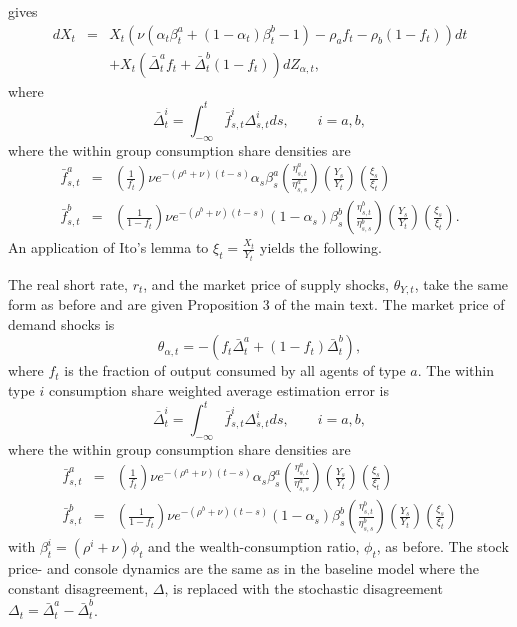 gives
\begin{eqnarray}
	dX_t &=& X_t\left( \nu\left(\alpha_t \beta^a_t + \left(1-\alpha_t\right)\beta^b_t - 1\right)  - \rho_a f_t - \rho_b \left(1-f_t\right)\right) dt  \nonumber \\
	&&+ X_t\left(\bar{\Delta}^{a}_t f_t + \bar{\Delta}^b_t \left(1-f_t\right)\right)dZ_{\alpha,t},
\end{eqnarray}
where 
\begin{equation}
	\bar{\Delta}^i_t = \int_{-\infty}^{t} \bar{f}^i_{s,t} \Delta^i_{s,t}ds,  \qquad i=a,b,
\end{equation}
where  the within group consumption share densities are
\begin{eqnarray}
	\bar{f}^a_{s,t} &=&\left(\frac{1}{f_t}\right)\nu e^{-\left(\rho^a+\nu\right)\left(t-s\right)} \alpha_s \beta^a_{s}\left(\frac{\eta^a_{s,t}}{\eta^a_{s,s}}\right)\left(\frac{Y_s}{Y_t}\right)\left(\frac{\xi_s}{\xi_t}\right)\\
	\bar{f}^b_{s,t} &=& \left(\frac{1}{1-f_t}\right)\nu e^{-\left(\rho^b+\nu\right)\left(t-s\right)} \left(1-\alpha_s\right) \beta^b_{s}\left(\frac{\eta^b_{s,t}}{\eta^b_{s,s}}\right)\left(\frac{Y_s}{Y_t}\right)\left(\frac{\xi_s}{\xi_t}\right).
\end{eqnarray}
An application of Ito's lemma to $\xi_t = \frac{X_t}{Y_t}$ yields the following. 

\begin{prop}\label{SDFgeneralDIS}
The real short rate, $r_t$, and the market price of supply shocks, $\theta_{Y,t}$, take the same form as before and are given Proposition 3 of the main text. The market price of demand shocks is 
\begin{equation}
\theta_{\alpha,t} %
= -\left(f_t \bar{\Delta}^a_t + \left(1-f_t\right)\bar{\Delta}^b_t\right), 
\end{equation}
where $f_t$ is the fraction of output consumed by all agents of type $a$. The within type $i$ consumption share weighted average estimation error is 
\begin{equation}
	\bar{\Delta}^i_t = \int_{-\infty}^{t} \bar{f}^i_{s,t} \Delta^i_{s,t}ds,  \qquad i=a,b,
\end{equation}
where  the within group consumption share densities are
\begin{eqnarray}
	\bar{f}^a_{s,t} &=&\left(\frac{1}{f_t}\right)\nu e^{-\left(\rho^a+\nu\right)\left(t-s\right)} \alpha_s \beta^a_{s}\left(\frac{\eta^a_{s,t}}{\eta^a_{s,s}}\right)\left(\frac{Y_s}{Y_t}\right)\left(\frac{\xi_s}{\xi_t}\right)\\
	\bar{f}^b_{s,t} &=& \left(\frac{1}{1-f_t}\right)\nu e^{-\left(\rho^b+\nu\right)\left(t-s\right)} \left(1-\alpha_s\right) \beta^b_{s}\left(\frac{\eta^b_{s,t}}{\eta^b_{s,s}}\right)\left(\frac{Y_s}{Y_t}\right)\left(\frac{\xi_s}{\xi_t}\right)
\end{eqnarray}
with $\beta^i_t = \left(\rho^i + \nu\right)\phi_t$ and the wealth-consumption ratio, $\phi_t$, as before. The stock price- and console dynamics are the same as in the baseline model where the constant disagreement, $\Delta$, is replaced with the stochastic disagreement $\Delta_t= \bar{\Delta}^a_t - \bar{\Delta}^b_t$. 
\end{prop}

